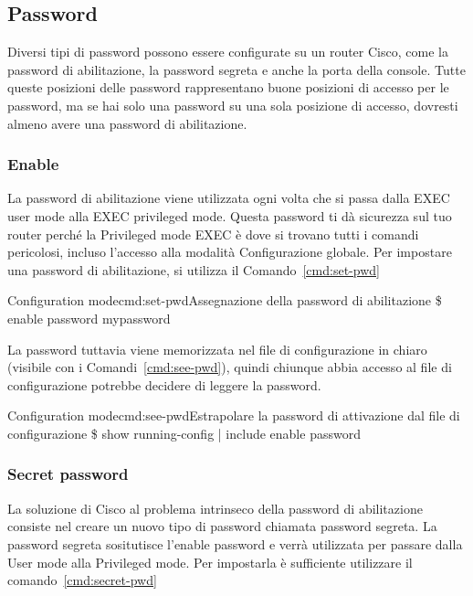 \subsection{Password}
Diversi tipi di password possono essere configurate su un router Cisco, come la password di abilitazione, la password segreta e anche la porta della console. Tutte queste posizioni delle password rappresentano buone posizioni di accesso per le password, ma se hai solo una password su una sola posizione di accesso, dovresti almeno avere una password di abilitazione.

\subsubsection{Enable}
La password di abilitazione viene utilizzata ogni volta che si passa dalla EXEC user mode alla EXEC privileged mode. Questa password ti dà sicurezza sul tuo router perché la Privileged mode EXEC è dove si trovano tutti i comandi pericolosi, incluso l’accesso alla modalità Configurazione globale. Per impostare una password di abilitazione, si utilizza il Comando~\ref{cmd:set-pwd}

\begin{cmds}{Configuration mode}{cmd:set-pwd}{Assegnazione della password di abilitazione}
    \$ enable password \textcolor{Highlight1}{mypassword}
\end{cmds}

La password tuttavia viene memorizzata nel file di configurazione in chiaro (visibile con i Comandi~\ref{cmd:see-pwd}), quindi chiunque abbia accesso al file di configurazione potrebbe decidere di leggere la password.

\begin{cmds}{Configuration mode}{cmd:see-pwd}{Estrapolare la password di attivazione dal file di configurazione}
    \$ show running-config | include enable password
\end{cmds}

\subsubsection{Secret password}
La soluzione di Cisco al problema intrinseco della password di abilitazione consiste nel creare un nuovo tipo di password chiamata password segreta. La password segreta sositutisce l'enable password e verrà utilizzata per passare dalla User mode alla Privileged mode. Per impostarla è sufficiente utilizzare il comando~\ref{cmd:secret-pwd}

